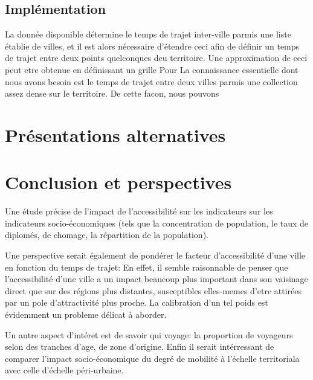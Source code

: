 \documentclass{vgtc}                          %
\begin{document}
\subsection{Implémentation}

\vspace{0.3cm}


La donnée disponible détermine le temps de trajet inter-ville parmis une liste établie de villes, et il est alors nécessaire d'étendre ceci afin de définir un temps de trajet entre deux points quelconques deu territoire. Une approximation de ceci peut etre obtenue en définissant un grille  Pour 
La connaissance essentielle dont nous avons besoin est le temps de trajet entre deux villes parmis une collection assez dense sur le territoire. De cette facon, nous pouvons 

\section{Présentations alternatives}



\section{Conclusion et perspectives}

\vspace{0.2cm}

Une étude précise de l'impact de l'accessibilité sur les indicateurs sur les indicateurs socio-économiques (tels que la concentration de population, le taux de diplomés, de chomage, la répartition de la population).

Une perspective serait également de pondérer le facteur d'accessibilité d'une ville en fonction du temps de trajet: En effet, il semble raisonnable de penser que l'accessibilité d'une ville a un impact beaucoup plus important dans son vaisinage direct que sur des régions plus distantes, susceptibles elles-memes d'etre attirées par un pole d'attractivité plus proche. La calibration d'un tel poids est évidemment un probleme délicat à aborder.


Un autre aspect d'intéret est de savoir qui voyage: la proportion de voyageurs selon des tranches d'age, de zone d'origine.
Enfin il serait intérressant de comparer l'impact socio-économique du degré de mobilité à l'échelle territoriala avec celle d'échelle péri-urbaine. 



%

%
%
%


\end{document}
